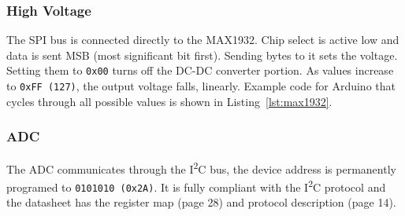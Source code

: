 \subsubsection{High Voltage}
The SPI bus is connected directly to the MAX1932. Chip select is active low and data is sent MSB (most significant bit first). Sending bytes to it sets the voltage. Setting them to \texttt{0x00} turns off the DC-DC converter portion. As values increase to \texttt{0xFF (127)}, the output voltage falls, linearly. Example code for Arduino that cycles through all possible values is shown in Listing~\ref{lst:max1932}.



\subsubsection{ADC}
The ADC communicates through the I\textsuperscript{2}C bus, the device address is permanently programed to \texttt{0101010 (0x2A)}. It is fully compliant with the I\textsuperscript{2}C protocol and the datasheet has the register map (page 28) and protocol description (page 14).




\begin{landscape}


\end{landscape}